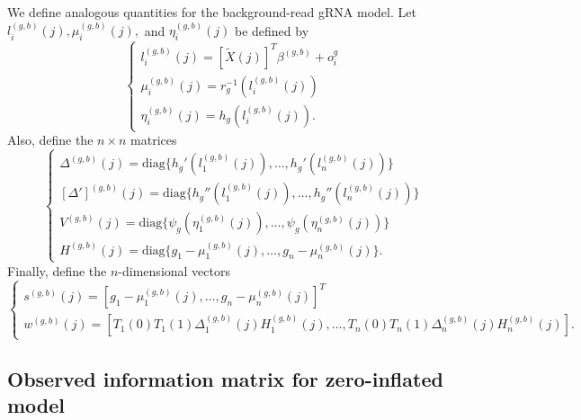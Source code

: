 \documentclass[12pt]{article}
\begin{document}
We define analogous quantities for the background-read gRNA model. Let $l_i^{(g,b)}(j), \mu_i^{(g,b)}(j),$ and $ \eta_i^{(g,b)}(j)$ be defined by 
$$\begin{cases}
l^{(g,b)}_i(j) = [ \tilde{X}(j)]^T \beta^{(g,b)} + o_i^g \\
\mu^{(g,b)}_i(j) = r_g^{-1}( l_i^{(g,b)}(j)) \\
\eta^{(g,b)}_i(j) = h_g(l_i^{(g,b)}(j)).
\end{cases}$$ Also, define the $n \times n$ matrices
$$\begin{cases}
\Delta^{(g,b)}(j) = \textrm{diag} \{ h_g'(l_1^{(g,b)}(j)), \dots, h_g'(l_n^{(g,b)}(j) ) \} \\
[\Delta']^{(g,b)}(j) = \textrm{diag}\{ h_g''(l_1^{(g,b)}(j)), \dots, h_g''( l_n^{(g,b)}(j)) \} \\
V^{(g,b)}(j) = \textrm{diag}\{ \psi_g( \eta^{(g,b)}_1(j)), \dots, \psi_g( \eta^{(g,b)}_n(j)) \} \\
H^{(g,b)}(j) = \textrm{diag}\{ g_1 - \mu_1^{(g,b)}(j), \dots, g_n - \mu_n^{(g,b)}(j) \} .
\end{cases}$$ 
Finally, define the $n$-dimensional vectors 
$$ \begin{cases} s^{(g,b)}(j) = [ g_1 - \mu^{(g,b)}_1(j), \dots, g_n - \mu^{(g,b)}_n(j)]^T \\
w^{(g,b)}(j) = [ T_1(0)T_1(1) \Delta^{(g,b)}_1(j) H^{(g,b)}_1(j), \dots, T_n(0)T_n(1) \Delta^{(g,b)}_n(j) H^{(g,b)}_n(j)].
\end{cases} $$

\subsection{Observed information matrix for zero-inflated model}\label{zero_inf_info_mat_sec}
\end{document}
